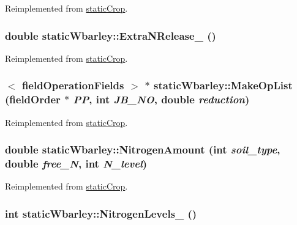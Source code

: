 Reimplemented from \hyperlink{classstatic_crop_ab7b9a8ecb31b10c4dcf44f13000e2f8c}{staticCrop}.\hypertarget{classstatic_wbarley_a7d37987b485ea121e57e3fdacb015673}{
\subsubsection[{ExtraNRelease\_\-}]{\setlength{\rightskip}{0pt plus 5cm}double staticWbarley::ExtraNRelease\_\- ()}}
\label{classstatic_wbarley_a7d37987b485ea121e57e3fdacb015673}


Reimplemented from \hyperlink{classstatic_crop_afe0cb8a7831afa941a37338f05227d67}{staticCrop}.\hypertarget{classstatic_wbarley_a6bfa41145c475ecf8c8dba2e4956f07b}{
\subsubsection[{MakeOpList}]{$<$ {\bf fieldOperationFields} $>$ $\ast$ staticWbarley::MakeOpList ({\bf fieldOrder} $\ast$ {\em PP}, \/  int {\em JB\_\-NO}, \/  double {\em reduction})}}
\label{classstatic_wbarley_a6bfa41145c475ecf8c8dba2e4956f07b}


Reimplemented from \hyperlink{classstatic_crop_a9b67ef1ae531a3afb32b63a4aeb5916b}{staticCrop}.\hypertarget{classstatic_wbarley_a8a889b049e3d78285a74ccf0bb0145a2}{
\subsubsection[{NitrogenAmount}]{\setlength{\rightskip}{0pt plus 5cm}double staticWbarley::NitrogenAmount (int {\em soil\_\-type}, \/  double {\em free\_\-N}, \/  int {\em N\_\-level})}}
\label{classstatic_wbarley_a8a889b049e3d78285a74ccf0bb0145a2}


Reimplemented from \hyperlink{classstatic_crop_af3aa85321a8a75406f8a0751b71587d0}{staticCrop}.\hypertarget{classstatic_wbarley_a77ecffa309df198f3479313e7aabfb27}{
\subsubsection[{NitrogenLevels\_\-}]{\setlength{\rightskip}{0pt plus 5cm}int staticWbarley::NitrogenLevels\_\- ()}}
\label{classstatic_wbarley_a77ecffa309df198f3479313e7aabfb27}



